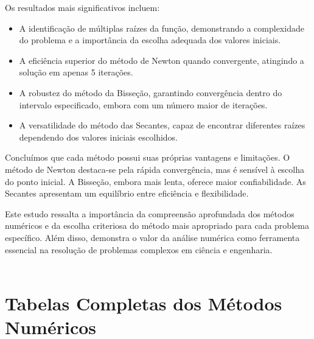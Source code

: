 \documentclass{article}
\begin{document}
Os resultados mais significativos incluem:

\begin{itemize}
    \item A identificação de múltiplas raízes da função, demonstrando a complexidade do problema e a importância da escolha adequada dos valores iniciais.
    \item A eficiência superior do método de Newton quando convergente, atingindo a solução em apenas 5 iterações.
    \item A robustez do método da Bisseção, garantindo convergência dentro do intervalo especificado, embora com um número maior de iterações.
    \item A versatilidade do método das Secantes, capaz de encontrar diferentes raízes dependendo dos valores iniciais escolhidos.
\end{itemize}

Concluímos que cada método possui suas próprias vantagens e limitações. O método de Newton destaca-se pela rápida convergência, mas é sensível à escolha do ponto inicial. A Bisseção, embora mais lenta, oferece maior confiabilidade. As Secantes apresentam um equilíbrio entre eficiência e flexibilidade.

Este estudo ressalta a importância da compreensão aprofundada dos métodos numéricos e da escolha criteriosa do método mais apropriado para cada problema específico. Além disso, demonstra o valor da análise numérica como ferramenta essencial na resolução de problemas complexos em ciência e engenharia.
\\ \\



\newpage
\appendix
\section{Tabelas Completas dos Métodos Numéricos}
\end{document}
